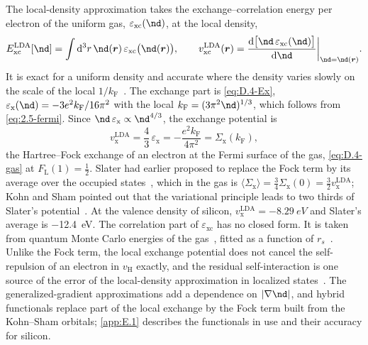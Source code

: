 The local-density approximation takes the exchange--correlation energy per electron of the uniform gas, $\varepsilon_{\mathrm{xc}}(\nd)$, at the local density,
\begin{equation}
  E_{\mathrm{xc}}^{\mathrm{LDA}}[\nd] = \int\dd^3r\,\nd(\vect{r})\,\varepsilon_{\mathrm{xc}}\bigl(\nd(\vect{r})\bigr), \qquad
  v_{\mathrm{xc}}^{\mathrm{LDA}}(\vect{r}) = \frac{\dd\bigl[\nd\,\varepsilon_{\mathrm{xc}}(\nd)\bigr]}{\dd\nd}\bigg|_{\nd = \nd(\vect{r})} .
  \label{eq:D.5-LDA}
\end{equation}
It is exact for a uniform density and accurate where the density varies slowly on the scale of the local $1/k_{\mathrm{F}}$~\cite{kohn1965self}. The exchange part is \cref{eq:D.4-Ex}, $\varepsilon_{\mathrm{x}}(\nd) = -3e^2k_{\mathrm{F}}/16\pi^2$ with the local $k_{\mathrm{F}} = (3\pi^2\nd)^{1/3}$, which follows from \cref{eq:2.5-fermi}. Since $\nd\,\varepsilon_{\mathrm{x}} \propto \nd^{4/3}$, the exchange potential is
\begin{equation*}
  v_{\mathrm{x}}^{\mathrm{LDA}} = \frac43\,\varepsilon_{\mathrm{x}} = -\frac{e^2k_{\mathrm{F}}}{4\pi^2} = \Sigma_{\mathrm{x}}(k_{\mathrm{F}}) ,
\end{equation*}
the Hartree--Fock exchange of an electron at the Fermi surface of the gas, \cref{eq:D.4-gas} at $F_{\mathrm{L}}(1) = \tfrac12$. Slater had earlier proposed to replace the Fock term by its average over the occupied states~\cite{slater1951simplification}, which in the gas is $\langle\Sigma_{\mathrm{x}}\rangle = \tfrac34\Sigma_{\mathrm{x}}(0) = \tfrac32v_{\mathrm{x}}^{\mathrm{LDA}}$; Kohn and Sham pointed out that the variational principle leads to two thirds of Slater's potential~\cite{kohn1965self}. At the valence density of silicon, $v_{\mathrm{x}}^{\mathrm{LDA}} = \SI{-8.29}{eV}$ and Slater's average is \SI{-12.4}{eV}. The correlation part of $\varepsilon_{\mathrm{xc}}$ has no closed form. It is taken from quantum Monte Carlo energies of the gas~\cite{ceperley1980ground}, fitted as a function of $r_s$~\cite{perdew1981self}. Unlike the Fock term, the local exchange potential does not cancel the self-repulsion of an electron in $v_{\mathrm{H}}$ exactly, and the residual self-interaction is one source of the error of the local-density approximation in localized states~\cite{perdew1981self}. The generalized-gradient approximations add a dependence on $|\nabla\nd|$, and hybrid functionals replace part of the local exchange by the Fock term built from the Kohn--Sham orbitals; \cref{app:E.1} describes the functionals in use and their accuracy for silicon.
